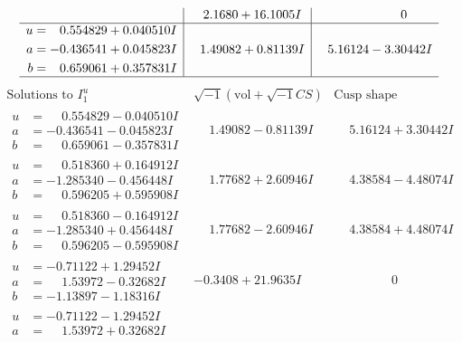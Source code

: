 \documentclass[1p]{elsarticle_modified}
\theoremstyle{definition}
\newcommand{\I}{\sqrt{-1}}
\begin{document}
$$\begin{array}{c|c|c}
 & \phantom{-}2.1680 + 16.1005 I & \phantom{-0.000000 } 0 \\ \hline\begin{aligned}
u &= \phantom{-}0.554829 + 0.040510 I \\
a &= -0.436541 + 0.045823 I \\
b &= \phantom{-}0.659061 + 0.357831 I\end{aligned}
 & \phantom{-}1.49082 + 0.81139 I & \phantom{-}5.16124 - 3.30442 I\\
 \hline 
 \end{array}$$\newpage$$\begin{array}{c|c|c}  
\text{Solutions to }I^u_{1}& \I (\text{vol} + \sqrt{-1}CS) & \text{Cusp shape}\\
 \hline 
\begin{aligned}
u &= \phantom{-}0.554829 - 0.040510 I \\
a &= -0.436541 - 0.045823 I \\
b &= \phantom{-}0.659061 - 0.357831 I\end{aligned}
 & \phantom{-}1.49082 - 0.81139 I & \phantom{-}5.16124 + 3.30442 I \\ \hline\begin{aligned}
u &= \phantom{-}0.518360 + 0.164912 I \\
a &= -1.285340 - 0.456448 I \\
b &= \phantom{-}0.596205 + 0.595908 I\end{aligned}
 & \phantom{-}1.77682 + 2.60946 I & \phantom{-}4.38584 - 4.48074 I \\ \hline\begin{aligned}
u &= \phantom{-}0.518360 - 0.164912 I \\
a &= -1.285340 + 0.456448 I \\
b &= \phantom{-}0.596205 - 0.595908 I\end{aligned}
 & \phantom{-}1.77682 - 2.60946 I & \phantom{-}4.38584 + 4.48074 I \\ \hline\begin{aligned}
u &= -0.71122 + 1.29452 I \\
a &= \phantom{-}1.53972 - 0.32682 I \\
b &= -1.13897 - 1.18316 I\end{aligned}
 & -0.3408 + 21.9635 I & \phantom{-0.000000 } 0 \\ \hline\begin{aligned}
u &= -0.71122 - 1.29452 I \\
a &= \phantom{-}1.53972 + 0.32682 I \\

\end{aligned}
\end{array}$$
\end{document}
